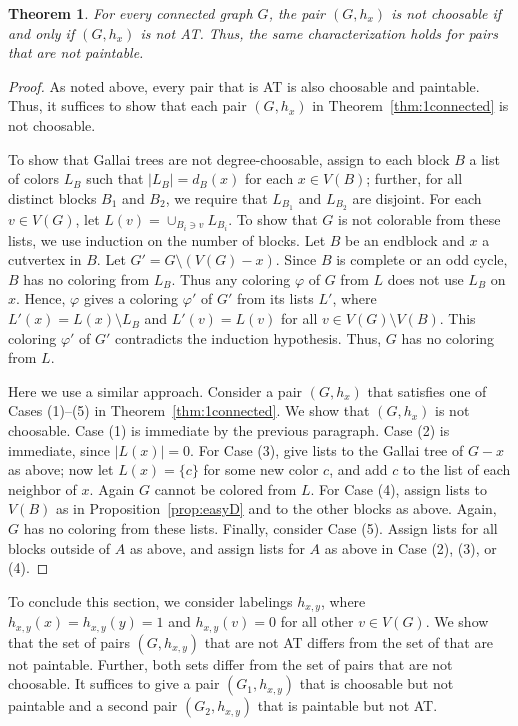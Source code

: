 \documentclass[12pt]{article}
\theoremstyle{plain}
\newtheorem{thm}{Theorem}[section]
\theoremstyle{definition}
\theoremstyle{remark}
\begin{document}
	\begin{thm}
		For every connected graph $G$, the pair $(G,h_x)$ is not choosable if and only
		if $(G,h_x)$ is not AT.  Thus, the same characterization holds for pairs that
		are not paintable.
	\end{thm}
	\begin{proof}
		As noted above, every pair that is AT is also choosable and paintable.  Thus, it
		suffices to show that each pair $(G,h_x)$ in Theorem~\ref{thm:1connected} is not
		choosable.
		
		To show that Gallai trees are not degree-choosable, assign to each block $B$ a
		list of colors $L_B$ such that $|L_B|=d_B(x)$ for each $x\in V(B)$; further, for
		all distinct blocks $B_1$ and $B_2$, we require that $L_{B_1}$ and $L_{B_2}$ are
		disjoint.  For each $v\in V(G)$, let $L(v)=\cup_{B_i\ni v}L_{B_i}$.  To show
		that $G$ is not colorable from these lists, we use induction on the number of
		blocks.  Let $B$ be an endblock and $x$ a cutvertex in $B$.  Let
		$G'=G\setminus(V(G)-x)$.  Since $B$ is complete or an odd cycle, $B$ has no
		coloring from $L_B$.  Thus any coloring $\varphi$ of $G$ from $L$ does not use
		$L_B$ on $x$.  Hence, $\varphi$ gives a coloring $\varphi'$ of $G'$ from its
		lists $L'$, where $L'(x)=L(x)\setminus L_B$ and $L'(v)=L(v)$ for all $v\in
		V(G)\setminus V(B)$.  This coloring $\varphi'$ of $G'$ contradicts the induction
		hypothesis.  Thus, $G$ has no coloring from $L$.
		
		Here we use a similar approach.  Consider a pair $(G,h_x)$ that satisfies one of
		Cases (1)--(5) in Theorem~\ref{thm:1connected}.  We show that $(G,h_x)$ is not
		choosable.  Case (1) is immediate by the previous paragraph.
		Case (2) is immediate, since $|L(x)|=0$.  For Case (3), give lists to the Gallai
		tree of $G-x$ as above; now let $L(x)=\{c\}$ for some new color $c$, and add $c$
		to the list of each neighbor of $x$.  Again $G$ cannot be colored from $L$.  For
		Case (4), assign lists to $V(B)$ as in Proposition~\ref{prop:easyD} and to the
		other blocks as above.  Again, $G$ has no coloring from
		these lists.  Finally, consider Case (5).  Assign lists for all blocks outside
		of $A$ as above, and assign lists for $A$ as above in Case (2), (3), or (4).
	\end{proof}
	
	To conclude this section, we consider labelings $h_{x,y}$, where $h_{x,y}(x)=
	h_{x,y}(y)=1$ and $h_{x,y}(v)=0$ for all other $v\in V(G)$.
	We show that the set of pairs $(G,h_{x,y})$ that are not AT differs from the set
	of that are not paintable.  Further, both sets differ from
	the set of pairs that are not choosable.
	It suffices to give a pair $(G_1,h_{x,y})$ that is choosable but not paintable
	and a second pair $(G_2,h_{x,y})$ that is paintable but not AT.
	
\end{document}
